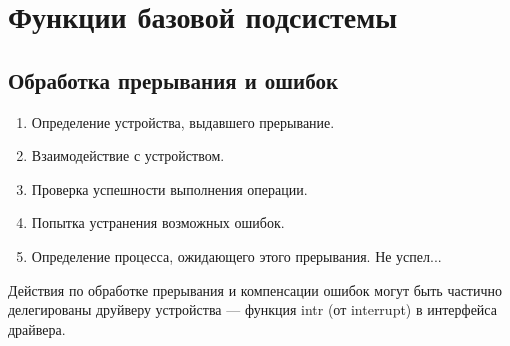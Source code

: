 \documentclass[12pt, a4paper]{article}
\begin{document}
    \section{Функции базовой подсистемы}
    \subsection{Обработка прерывания и ошибок}
    \begin{enumerate}
        \item Определение устройства, выдавшего прерывание.
        \item Взаимодействие с устройством.
        \item Проверка успешности выполнения операции.
        \item Попытка устранения возможных ошибок.
        \item Определение процесса, ожидающего этого прерывания. Не успел...
    \end{enumerate}
    Действия по обработке прерывания и компенсации ошибок могут быть частично делегированы друйверу устройства --- функция intr (от interrupt) в интерфейса драйвера.
\end{document}
